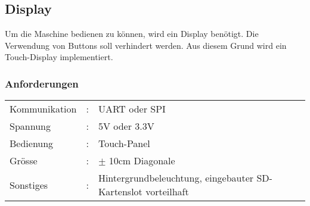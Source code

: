 \newpage
\subsection{Display}
\label{subsubsec:Grobkonzept_Display}
Um die Maschine bedienen zu können, wird ein Display benötigt. Die Verwendung von Buttons soll verhindert werden. Aus diesem Grund wird ein Touch-Display implementiert.

\subsubsection{Anforderungen}\label{par:Anforderungen_Display}

\begin{tabular}{lll}
Kommunikation & : & UART oder SPI\\
Spannung & : & 5V oder 3.3V \\
Bedienung & : & Touch-Panel \\
Grösse & : & $\pm$ 10cm Diagonale \\
Sonstiges & : & Hintergrundbeleuchtung, eingebauter SD-Kartenslot vorteilhaft \\
\end{tabular}


